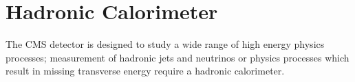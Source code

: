 \section{Hadronic Calorimeter}
The CMS detector is designed to study a wide range of high energy 
physics processes; measurement of hadronic jets and neutrinos or
physics processes which result in missing transverse energy require
a hadronic calorimeter. 
